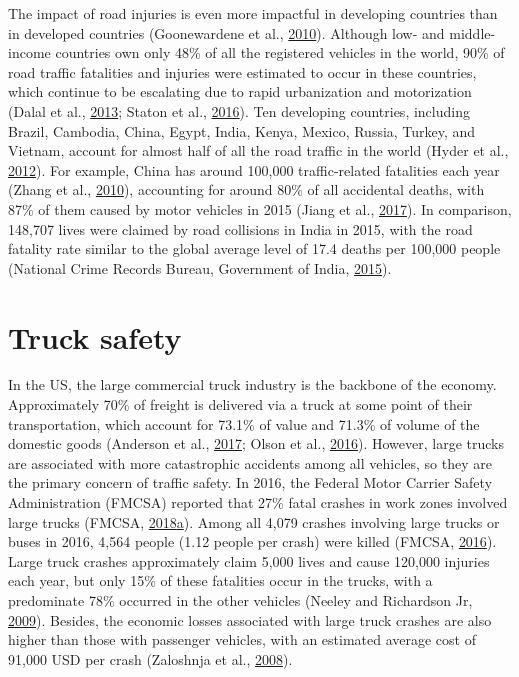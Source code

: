 \documentclass[12pt]{book}
\numberwithin{equation}{chapter}
\begin{document}
The impact of road injuries is even more impactful in developing countries than in developed countries (Goonewardene et al., \protect\hyperlink{ref-goonewardene2010road}{2010}). Although low- and middle-income countries own only 48\% of all the registered vehicles in the world, 90\% of road traffic fatalities and injuries were estimated to occur in these countries, which continue to be escalating due to rapid urbanization and motorization (Dalal et al., \protect\hyperlink{ref-dalal2013economics}{2013}; Staton et al., \protect\hyperlink{ref-staton2016road}{2016}). Ten developing countries, including Brazil, Cambodia, China, Egypt, India, Kenya, Mexico, Russia, Turkey, and Vietnam, account for almost half of all the road traffic in the world (Hyder et al., \protect\hyperlink{ref-hyder2012addressing}{2012}). For example, China has around 100,000 traffic-related fatalities each year (Zhang et al., \protect\hyperlink{ref-zhang2010road}{2010}), accounting for around 80\% of all accidental deaths, with 87\% of them caused by motor vehicles in 2015 (Jiang et al., \protect\hyperlink{ref-jiang2017transport}{2017}). In comparison, 148,707 lives were claimed by road collisions in India in 2015, with the road fatality rate similar to the global average level of 17.4 deaths per 100,000 people (National Crime Records Bureau, Government of India, \protect\hyperlink{ref-india2015}{2015}).

\hypertarget{truck-safety}{%
\section{Truck safety}\label{truck-safety}}

In the US, the large commercial truck industry is the backbone of the economy. Approximately 70\% of freight is delivered via a truck at some point of their transportation, which account for 73.1\% of value and 71.3\% of volume of the domestic goods (Anderson et al., \protect\hyperlink{ref-anderson2017exploratory}{2017}; Olson et al., \protect\hyperlink{ref-olson2016weight}{2016}).
However, large trucks are associated with more catastrophic accidents among all vehicles, so they are the primary concern of traffic safety. In 2016, the Federal Motor Carrier Safety Administration (FMCSA) reported that 27\% fatal crashes in work zones involved large trucks (FMCSA, \protect\hyperlink{ref-fmcsareport2016}{2018}\protect\hyperlink{ref-fmcsareport2016}{a}). Among all 4,079 crashes involving large trucks or buses in 2016, 4,564 people (1.12 people per crash) were killed (FMCSA, \protect\hyperlink{ref-fmcsafacts2016}{2016}). Large truck crashes approximately claim 5,000 lives and cause 120,000 injuries each year, but only 15\% of these fatalities occur in the trucks, with a predominate 78\% occurred in the other vehicles (Neeley and Richardson Jr, \protect\hyperlink{ref-neeley2009effect}{2009}). Besides, the economic losses associated with large truck crashes are also higher than those with passenger vehicles, with an estimated average cost of 91,000 USD per crash (Zaloshnja et al., \protect\hyperlink{ref-zaloshnja2008unit}{2008}).
\end{document}
